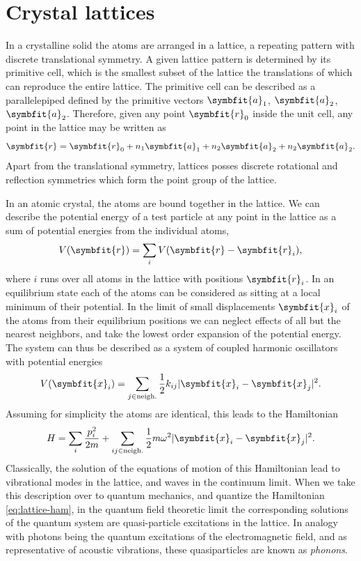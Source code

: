 \documentclass[b5paper, 10pt, twoside]{book}
\renewcommand{\vec}[1]{\symbfit{#1}}
\begin{document}
\section{Crystal lattices}

In a crystalline solid the atoms are arranged in a lattice, a repeating pattern with discrete translational symmetry. A given lattice pattern is determined by its primitive cell, which is the smallest subset of the lattice the translations of which can reproduce the entire lattice. The primitive cell can be described as a parallelepiped defined by the primitive vectors $\vec{a}_1$, $\vec{a}_2$, $\vec{a}_2$. Therefore, given any point $\vec{r}_0$ inside the unit cell, any point in the lattice may be written as
\begin{equation}
    \vec{r}=\vec{r}_0+n_1\vec{a}_1+n_2\vec{a}_2+n_2\vec{a}_2.
\end{equation}
Apart from the translational symmetry, lattices posses discrete rotational and reflection symmetries which form the point group of the lattice.

In an atomic crystal, the atoms are bound together in the lattice. We can describe the potential energy of a test particle at any point in the lattice as a sum of potential energies from the individual atoms,
\begin{equation}
    V(\vec{r})=\sum_iV(\vec{r}-\vec{r}_i),
    \label{eq:crystal-atom-pe}
\end{equation}
where $i$ runs over all atoms in the lattice with positions $\vec{r}_i$. In an equilibrium state each of the atoms can be considered as sitting at a local minimum of their potential. In the limit of small displacements $\vec{x}_i$ of the atoms from their equilibrium positions we can neglect effects of all but the nearest neighbors, and take the lowest order expansion of the potential energy. The system can thus be described as a system of coupled harmonic oscillators with potential energies
\begin{equation}
    V(\vec{x}_i)=\sum_{j\in\text{neigh.}}\frac{1}{2}k_{ij}|\vec{x}_i-\vec{x}_j|^2.
\end{equation}
Assuming for simplicity the atoms are identical, this leads to the Hamiltonian
\begin{equation}
    H=\sum_i\frac{p_i^2}{2m}+\sum_{ij\in\text{neigh.}}\frac{1}{2}m\omega^2|\vec{x}_i-\vec{x}_j|^2.
    \label{eq:lattice-ham}
\end{equation}
Classically, the solution of the equations of motion of this Hamiltonian lead to vibrational modes in the lattice, and waves in the continuum limit. When we take this description over to quantum mechanics, and quantize the Hamiltonian \eqref{eq:lattice-ham}, in the quantum field theoretic limit the corresponding solutions of the quantum system are quasi-particle excitations in the lattice. In analogy with photons being the quantum excitations of the electromagnetic field, and as representative of acoustic vibrations, these quasiparticles are known as \emph{phonons}.
\end{document}
